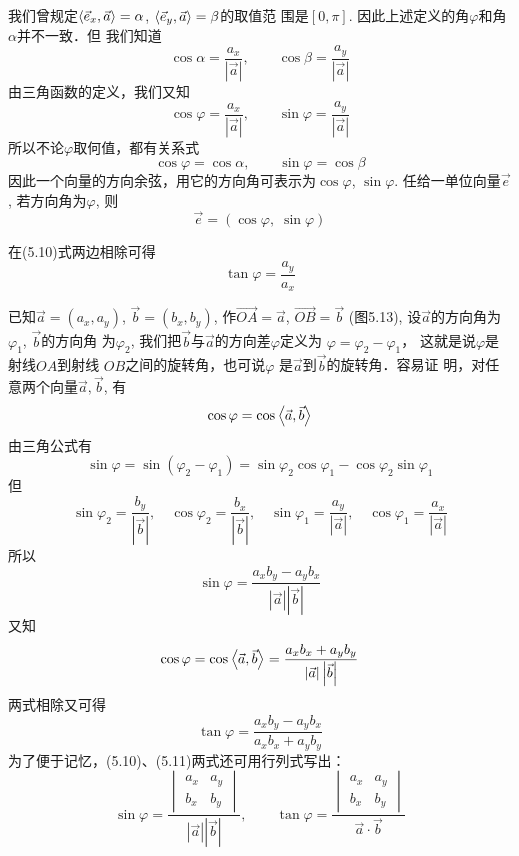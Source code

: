我们曾规定$\left\langle \vec{e}_x,\vec{a} \right\rangle=\alpha$, $\left\langle \vec{e}_y,\vec{a} \right\rangle=\beta$的取值范
围是$[0,\pi]$. 因此上述定义的角$\varphi$和角$\alpha$并不一致．但
我们知道
\[\cos\alpha=\frac{a_x}{|\vec{a}|},\qquad \cos\beta=\frac{a_y}{|\vec{a}|}\]
由三角函数的定义，我们又知
\[\cos\varphi=\frac{a_x}{|\vec{a}|},\qquad \sin\varphi=\frac{a_y}{|\vec{a}|}\]
所以不论$\varphi$取何值，都有关系式
\[\cos\varphi=\cos\alpha,\qquad \sin\varphi=\cos\beta\]
因此一个向量的方向余弦，用它的方向角可表示为$\cos\varphi$, $
\sin\varphi$. 任给一单位向量$\vec{e}$, 若方向角为$\varphi$, 则
\[\vec{e}=(\cos\varphi,\; \sin\varphi)\]

在(5.10)式两边相除可得
\[\tan \varphi =\frac{a_y}{a_x}\]

\begin{figure}[htp]
    \centering
{}
    \caption{}
\end{figure}


已知$\vec{a}=(a_x,a_y)$, $\vec{b}=(b_x,b_y)$, 作$\Vec{OA}=\vec{a}$, $\Vec{OB}=\vec{b}$ (图5.13), 设$\vec{a}$的方向角为$\varphi_1$, $\vec{b}$的方向角
为$\varphi_2$, 我们把$\vec{b}$与$\vec{a}$的方向差$\varphi$定义为
$\varphi=\varphi_2-\varphi_1$，
这就是说$\varphi$是射线$OA$到射线
$OB$之间的旋转角，也可说$\varphi$ 
是$\vec{a}$到$\vec{b}$的旋转角．容易证
明，对任意两个向量$\vec{a},\vec{b}$, 
有
\[\cos\varphi =\cos\left\langle \vec{a},\vec{b} \right\rangle\]
由三角公式有
\[\sin\varphi  =\sin(\varphi_2-\varphi_1 ) = \sin\varphi_2\cos\varphi_1 -\cos\varphi_2\sin\varphi_1\]
但
\[\sin\varphi_2=\frac{b_y}{|\vec{b}|},\quad \cos\varphi_2=\frac{b_x}{|\vec{b}|},\quad \sin\varphi_1=\frac{a_y}{|\vec{a}|},\quad \cos\varphi_1=\frac{a_x}{|\vec{a}|}\]
所以
\begin{equation}
    \sin\varphi=\frac{a_xb_y-a_yb_x}{|\vec{a}|\left|\vec{b}\right|}
\end{equation}
又知
\[\cos\varphi =\cos\left\langle \vec{a},\vec{b} \right\rangle=\dfrac{a_xb_x+a_yb_y}{|\vec{a}|\left|\vec{b}\right|}\]
两式相除又可得
\[\tan\varphi =\frac{a_xb_y-a_yb_x}{a_xb_x+a_yb_y}\]
为了便于记忆，(5.10)、(5.11)两式还可用行列式写出：
\[\sin\varphi=\frac{\begin{vmatrix}
    a_x& a_y\\b_x&b_y
\end{vmatrix}}{|\vec{a}|\left|\vec{b}\right|},\qquad \tan\varphi=\frac{\begin{vmatrix}
    a_x& a_y\\b_x&b_y
\end{vmatrix}}{\vec{a}\cdot \vec{b}}\]


